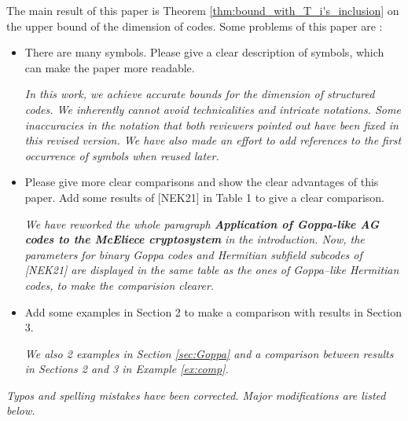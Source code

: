 \documentclass[12pt,a4paper]{amsart}
\begin{document}
The main result of this paper is Theorem \ref{thm:bound_with_T_i's_inclusion} on the upper bound of the dimension of codes. Some problems
of this paper are :
\begin{itemize}
\item  There are many symbols. Please give a clear description of symbols, which can make the paper more readable.

\textit{In this work, we achieve accurate bounds for the dimension of structured codes. We inherently cannot avoid technicalities and intricate notations. Some inaccuracies in the notation that both reviewers pointed out have been fixed in this revised version. We have also made an effort to add references to the first occurrence of symbols when reused later.}


\item  Please give more clear comparisons and show the clear advantages of this paper. Add some results of [NEK21] in Table 1 to give a clear comparison.

\textit{We have reworked the whole paragraph \textbf{Application of Goppa-like AG codes to the McEliece cryptosystem} in the introduction. Now, the parameters for binary Goppa codes and Hermitian subfield subcodes of [NEK21] are displayed in the same table as the ones of Goppa--like Hermitian codes, to make the comparision clearer.}
	
	\item Add some examples in Section 2 to make a comparison with results in Section 3. 
	
	\textit{We also 2 examples in Section \ref{sec:Goppa} and a comparison between results in Sections 2 and 3 in Example \ref{ex:comp}.}

\end{itemize}

\textit{Typos and spelling mistakes have been corrected. Major modifications are listed below.} \\
\end{document}
